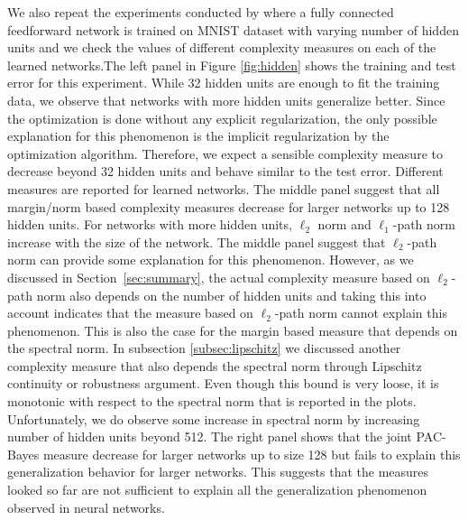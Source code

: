 \documentclass{article}
\begin{document}
We also repeat the experiments conducted by \citet{neyshabur15b} where
a fully connected feedforward network is trained on MNIST dataset with
varying number of hidden units and we check the values of different
complexity measures on each of the learned networks.The left panel in
Figure \ref{fig:hidden} shows the training and test error for this
experiment. While 32 hidden units are enough to fit the training data,
we observe that networks with more hidden units generalize better.
Since the optimization is done without any explicit regularization,
the only possible explanation for this phenomenon is the implicit
regularization by the optimization algorithm. Therefore, we expect a
sensible complexity measure to decrease beyond 32 hidden units and
behave similar to the test error. Different measures are reported for
learned networks. The middle panel suggest that all margin/norm based
complexity measures decrease for larger networks up to 128 hidden
units. For networks with more hidden units, $\ell_2$ norm and
$\ell_1$-path norm increase with the size of the network. The middle
panel suggest that $\ell_2$-path norm can provide some explanation for
this phenomenon. However, as we discussed in
Section~\ref{sec:summary}, the actual complexity measure based on
$\ell_2$-path norm also depends on the number of hidden units and
taking this into account indicates that the measure based on
$\ell_2$-path norm cannot explain this phenomenon. This is also the
case for the margin based measure that depends on the spectral norm.
In subsection \ref{subsec:lipschitz} we discussed another complexity
measure that also depends the spectral norm through Lipschitz
continuity or robustness argument. Even though this bound is very
loose, it is monotonic with respect to the spectral norm that is
reported in the plots. Unfortunately, we do observe some increase in
spectral norm by increasing number of hidden units beyond 512. The
right panel shows that the joint PAC-Bayes measure decrease for larger
networks up to size 128 but fails to explain this generalization
behavior for larger networks. This suggests that the measures looked so
far are not sufficient to explain all the generalization phenomenon
observed in neural networks.
\end{document}
